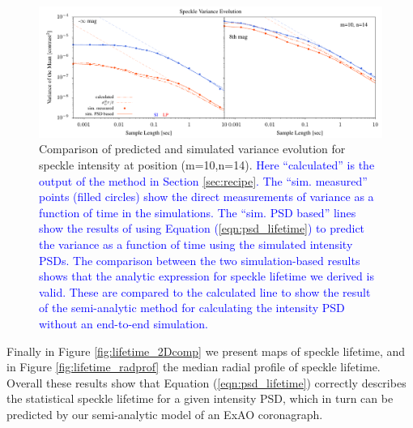 \documentclass[10pt,preprint]{aastex631}
\newcommand{\jrmadd}[1]{\textcolor{blue}{#1}}
\begin{document}
\begin{figure}
\hspace{-0.3in}
\includegraphics[width=6.5in]{binVarComp_lp_10_14.pdf}
\caption{Comparison of predicted and simulated variance evolution for speckle intensity at position (m=10,n=14).  \jrmadd{Here ``calculated'' is the output of the method in Section \ref{sec:recipe}.  The ``sim. measured'' points (filled circles) show the direct measurements of variance as a function of time in the simulations.  The ``sim. PSD based'' lines show the results of using Equation (\ref{eqn:psd_lifetime}) to predict the variance as a function of time using the simulated intensity PSDs.  The comparison between the two simulation-based results shows that the analytic expression for speckle lifetime we derived is valid.  These are compared to the calculated line to show the result of the semi-analytic method for calculating the intensity PSD without an end-to-end simulation.}  \label{fig:binvarcomp}}
\end{figure}

Finally in Figure \ref{fig:lifetime_2Dcomp} we present maps of speckle lifetime, and in Figure \ref{fig:lifetime_radprof} the median radial profile of speckle lifetime.  Overall these results show that Equation (\ref{eqn:psd_lifetime}) correctly describes the statistical speckle lifetime for a given intensity PSD, which in turn can be predicted by our semi-analytic model of an ExAO coronagraph.
\end{document}
